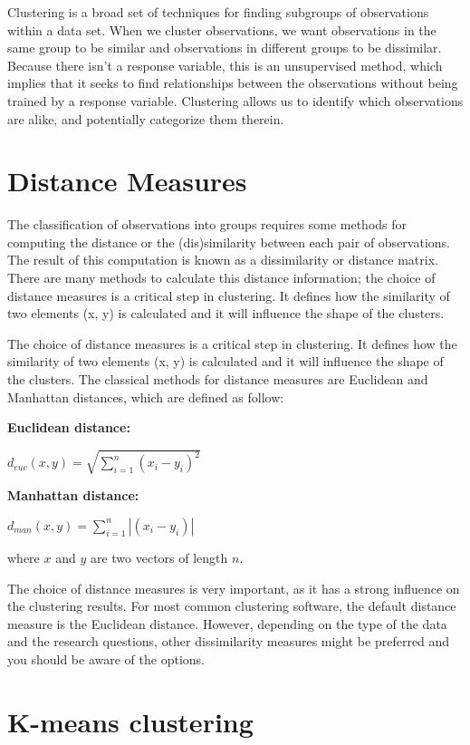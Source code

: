 \documentclass[]{book}
\begin{document}
Clustering is a broad set of techniques for finding subgroups of observations within a data set. When we cluster observations, we want observations in the same group to be similar and observations in different groups to be dissimilar. Because there isn't a response variable, this is an unsupervised method, which implies that it seeks to find relationships between the observations without being trained by a response variable. Clustering allows us to identify which observations are alike, and potentially categorize them therein.

\hypertarget{distance-measures}{%
\section{Distance Measures}\label{distance-measures}}

The classification of observations into groups requires some methods for computing the distance or the (dis)similarity between each pair of observations. The result of this computation is known as a dissimilarity or distance matrix. There are many methods to calculate this distance information; the choice of distance measures is a critical step in clustering. It defines how the similarity of two elements (x, y) is calculated and it will influence the shape of the clusters.

The choice of distance measures is a critical step in clustering. It defines how the similarity of two elements (x, y) is calculated and it will influence the shape of the clusters. The classical methods for distance measures are Euclidean and Manhattan distances, which are defined as follow:

\textbf{Euclidean distance:}

\(d_{euc}(x,y) = \sqrt{\sum^n_{i=1}(x_i - y_i)^2}\)

\textbf{Manhattan distance:}

\(d_{man}(x,y) = \sum^n_{i=1}|(x_i - y_i)|\)

where \(x\) and \(y\) are two vectors of length \(n\).

The choice of distance measures is very important, as it has a strong influence on the clustering results. For most common clustering software, the default distance measure is the Euclidean distance. However, depending on the type of the data and the research questions, other dissimilarity measures might be preferred and you should be aware of the options.

\hypertarget{k-means-clustering}{%
\section{K-means clustering}\label{k-means-clustering}}
\end{document}

